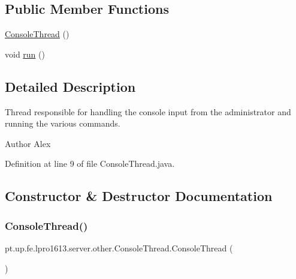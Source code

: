 \subsection*{Public Member Functions}
\begin{DoxyCompactItemize}
\item 
\hyperlink{classpt_1_1up_1_1fe_1_1lpro1613_1_1server_1_1other_1_1_console_thread_a952e675cf3430f7edd3c3280cceb2f0b}{Console\+Thread} ()
\item 
void \hyperlink{classpt_1_1up_1_1fe_1_1lpro1613_1_1server_1_1other_1_1_console_thread_a7740e1ce4d58dbe4cfcbf6caaa998290}{run} ()
\end{DoxyCompactItemize}


\subsection{Detailed Description}
Thread responsible for handling the console input from the administrator and running the various commands.

\begin{DoxyAuthor}{Author}
Alex 
\end{DoxyAuthor}


Definition at line 9 of file Console\+Thread.\+java.



\subsection{Constructor \& Destructor Documentation}
\hypertarget{classpt_1_1up_1_1fe_1_1lpro1613_1_1server_1_1other_1_1_console_thread_a952e675cf3430f7edd3c3280cceb2f0b}{}\label{classpt_1_1up_1_1fe_1_1lpro1613_1_1server_1_1other_1_1_console_thread_a952e675cf3430f7edd3c3280cceb2f0b} 
\subsubsection{\texorpdfstring{Console\+Thread()}{ConsoleThread()}}
{\footnotesize\ttfamily pt.\+up.\+fe.\+lpro1613.\+server.\+other.\+Console\+Thread.\+Console\+Thread (\begin{DoxyParamCaption}{ }\end{DoxyParamCaption})}



